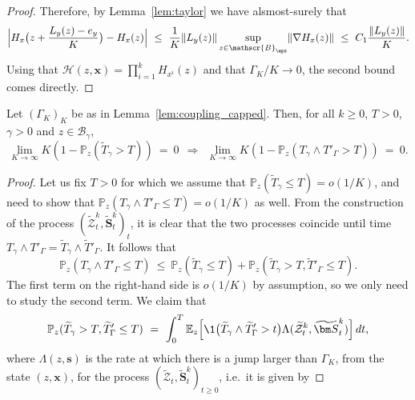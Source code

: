 \begin{refsegment}
\begin{proof}
Therefore, by Lemma~\ref{lem:taylor} we have alsmost-surely that
\begin{equation*}
\Big| H_x\big(z+ \frac{L_y(z)-e_y}{K}\big)-H_x(z)\Big|\ \leq\   \frac{1}{K}\lVert L_y(z)\rVert\sup_{z\in \mathscr{B}_{\eps}}\lVert \nabla H_x(z)\rVert \ \leq\   C_1\frac{\lVert L_y(z)\rVert}{K}.
\end{equation*}
Using that $\mathcal{H}(z,\bm x)=\prod_{i=1}^k H_{x^i}(z)$ and that $\Gamma_K/K\to 0$, the second bound comes directly.
\end{proof}
\begin{lem}\label{lem:T_gamma_for_coupling}
Let $(\Gamma_K)_K$ be as in Lemma~\ref{lem:coupling_capped}. Then, for all $k\geq 0$, $T>0$, $\gamma>0$ and $z\in\mathscr{B}_\gamma$,
    \begin{equation*}
        \lim_{K\to\infty} K(1- \mathbb{P}_{z}( \widetilde{T}_\gamma > T))\ =\ 0\ \ \Longrightarrow\ \ \lim_{K\to\infty} K(1- \mathbb{P}_{z}( T_\gamma \wedge T'_\Gamma > T))\ =\ 0. 
    \end{equation*}
\end{lem}
    \begin{proof}
       Let us fix $T>0$ for which we assume that $ \mathbb{P}_{z}( \widetilde{T}_\gamma \leq T) = o(1/K)$, and need to show that $\mathbb{P}_{z}( T_\gamma \wedge T'_\Gamma \leq T) = o(1/K)$ as well.
    From the construction of the process $(\widetilde{\mathcal Z}^k_t, \widetilde{\bm S}^k_t)_t$, it
    is clear that the two processes coincide until time $T_\gamma
    \wedge T'_\Gamma =\widetilde{T}_\gamma\wedge \widetilde{T}'_\Gamma$. %
    It follows that
    \[
        \mathbb{P}_{z}(T_\gamma \wedge T'_\Gamma \leq T) \ \leq \ \mathbb{P}_{z}(\widetilde{T}_\gamma \leq T) + \mathbb{P}_{z}(\widetilde{T}_\gamma > T, \widetilde{T}'_\Gamma \leq T).
    \]
    The first term on the right-hand side is $o(1/K)$ by assumption, so we only need to study the second term.
    We claim that
    \begin{equation} \label{Ch4:eq:claim-dynkin}
        \mathbb{P}_{z}(\widetilde{T}_\gamma > T, \widetilde{T}'_\Gamma \leq T)\ =\ \int_0^T \mathbb{E}_{z} \Big[\1 \big( \widetilde{T}_\gamma \wedge \widetilde{T}'_\Gamma > t \big) \Lambda(\widetilde{\mathcal Z}^k_t, \widetilde{\bm S}^k_t)\Big] \,dt,
    \end{equation}
    where $\Lambda(z, \bm s)$ is the rate at which there is a jump larger than $\Gamma_K$, from the state $(z, \bm x)$, for the process $(\widetilde{\mathcal{Z}}_t,\widetilde{\bm S}^k_t)_{t\geq 0}$, i.e.\ it is given by 

\end{proof}
\end{refsegment}
